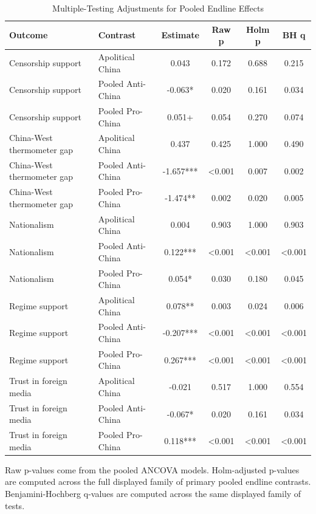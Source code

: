 \begin{table}[H]
\centering
\caption{Multiple-Testing Adjustments for Pooled Endline Effects}
\label{tab:multiple_testing_t1}
\footnotesize
\begin{threeparttable}
\begin{tabular}{llcccc}
\toprule
Outcome & Contrast & Estimate & Raw p & Holm p & BH q \\
\midrule
Censorship support & Apolitical China & 0.043 & 0.172 & 0.688 & 0.215 \\
Censorship support & Pooled Anti-China & -0.063* & 0.020 & 0.161 & 0.034 \\
Censorship support & Pooled Pro-China & 0.051+ & 0.054 & 0.270 & 0.074 \\
China-West thermometer gap & Apolitical China & 0.437 & 0.425 & 1.000 & 0.490 \\
China-West thermometer gap & Pooled Anti-China & -1.657*** & <0.001 & 0.007 & 0.002 \\
China-West thermometer gap & Pooled Pro-China & -1.474** & 0.002 & 0.020 & 0.005 \\
Nationalism & Apolitical China & 0.004 & 0.903 & 1.000 & 0.903 \\
Nationalism & Pooled Anti-China & 0.122*** & <0.001 & <0.001 & <0.001 \\
Nationalism & Pooled Pro-China & 0.054* & 0.030 & 0.180 & 0.045 \\
Regime support & Apolitical China & 0.078** & 0.003 & 0.024 & 0.006 \\
Regime support & Pooled Anti-China & -0.207*** & <0.001 & <0.001 & <0.001 \\
Regime support & Pooled Pro-China & 0.267*** & <0.001 & <0.001 & <0.001 \\
Trust in foreign media & Apolitical China & -0.021 & 0.517 & 1.000 & 0.554 \\
Trust in foreign media & Pooled Anti-China & -0.067* & 0.020 & 0.161 & 0.034 \\
Trust in foreign media & Pooled Pro-China & 0.118*** & <0.001 & <0.001 & <0.001 \\
\bottomrule
\end{tabular}
\begin{tablenotes}[flushleft]
\footnotesize
\item Raw p-values come from the pooled ANCOVA models. Holm-adjusted p-values are computed across the full displayed family of primary pooled endline contrasts. Benjamini-Hochberg q-values are computed across the same displayed family of tests.
\end{tablenotes}
\end{threeparttable}
\end{table}
